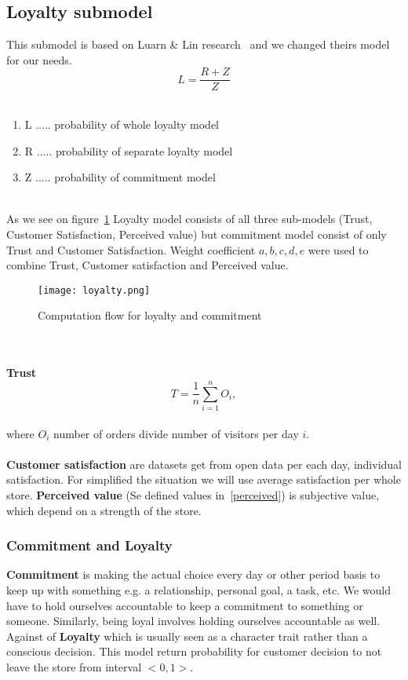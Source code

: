 \subsection{Loyalty submodel} \label{subsec:model_loyalty}
This submodel is based on Luarn \& Lin research~\cite{luarn} and we changed theirs model for our needs.\\
\begin{equation} \label{eq:19}
L = \frac{R+Z}{Z}
\end{equation}
\\
\begin{enumerate}
    \item L ..... probability of whole loyalty model
    \item R ..... probability of separate loyalty model
    \item Z ..... probability of commitment model
\end{enumerate}
\\
As we see on figure~\ref{Loyalty scheme} Loyalty model consists of all three sub-models (Trust, Customer Satisfaction, Perceived value)
but commitment model consist of only Trust and Customer Satisfaction.
Weight coefficient $a,b,c,d,e$ were used to combine Trust, Customer satisfaction and Perceived value.\\
\begin{figure}[h!]
    \begin{center}
        \texttt{[image: loyalty.png]}
    \end{center}
    \caption{Computation flow for loyalty and commitment~\cite{luarn}}
    \label{Loyalty scheme}
\end{figure}\\
\\
\textbf{Trust}
\begin{equation} \label{eq:20}
T = \frac{1}{n} \sum_{i=1}^{n} O_i,
\end{equation}
\\
where $O_i$ number of orders divide number of visitors per day $i$.
\\
\\
\textbf{Customer satisfaction} are datasets get from open data per each day, individual satisfaction.
For simplified the situation we will use average satisfaction per whole store.
\textbf{Perceived value} (Se defined values in~\ref{perceived}) is subjective value, which depend on a strength of the store.
\subsubsection{Commitment and Loyalty} \label{subsubsec:model_loyalty_commitment}
\textbf{Commitment} is making the actual choice every day or other period basis to keep up with something e.g. a relationship, personal goal, a task, etc.
We would have to hold ourselves accountable to keep a commitment to something or someone.
Similarly, being loyal involves holding ourselves accountable as well.\\
Against of \textbf{Loyalty} which is usually seen as a character trait rather than a conscious decision.
This model return probability for customer decision to not leave the store from interval $<0,1>$.\\
